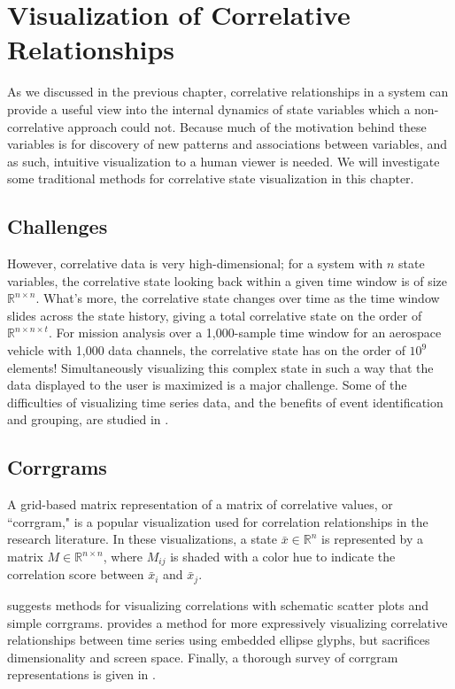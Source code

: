 \chapter{Visualization of Correlative Relationships}

As we discussed in the previous chapter, correlative relationships in a system can provide a useful view into the internal dynamics of state variables which a non-correlative approach could not. Because much of the motivation behind these variables is for discovery of new patterns and associations between variables, and as such, intuitive visualization to a human viewer is needed. We will investigate some traditional methods for correlative state visualization in this chapter.

\section{Challenges}

However, correlative data is very high-dimensional; for a system with $n$ state variables, the correlative state looking back within a given time window is of size $\mathbb{R}^{n \times n}$. What's more, the correlative state changes over time as the time window slides across the state history, giving a total correlative state on the order of $\mathbb{R}^{n \times n \times t}$. For mission analysis over a 1,000-sample time window for an aerospace vehicle with 1,000 data channels, the correlative state has on the order of $10^{9}$ elements! Simultaneously visualizing this complex state in such a way that the data displayed to the user is maximized is a major challenge. Some of the difficulties of visualizing time series data, and the benefits of event identification and grouping, are studied in \cite{muller2003visualization}.

\section{Corrgrams}

A grid-based matrix representation of a matrix of correlative values, or ``corrgram," is a popular visualization used for correlation relationships in the research literature. In these visualizations, a state $\bar{x} \in \mathbb{R}^{n}$ is represented by a matrix $M \in \mathbb{R}^{n \times n}$, where $M_{ij}$ is shaded with a color hue to indicate the correlation score between $\bar{x}_{i}$ and $\bar{x}_{j}$.

\cite{yeh2007exploratory} suggests methods for visualizing correlations with schematic scatter plots and simple corrgrams. \cite{murdoch1996graphical} provides a method for more expressively visualizing correlative relationships between time series using embedded ellipse glyphs, but sacrifices dimensionality and screen space. Finally, a thorough survey of corrgram representations is given in \cite{friendly2002corrgrams}. 

